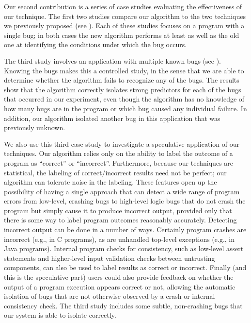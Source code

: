 \documentclass[draft]{sig-alternate}
\begin{document}
Our second contribution is a series of case studies evaluating the effectiveness of
our technique.  The first two studies compare our algorithm to the two techniques
we previously proposed (see ).  Each of these studies focuses on a
program with a single bug; in both cases the new algorithm
performs at least as well as the old one at identifying the conditions under which the bug occurs.  

The third study involves an application with multiple known bugs (see
).  Knowing the bugs makes this a controlled study, 
in the sense that we are able to determine whether the algorithm fails to recognize any of the
bugs.  The results show that the algorithm correctly
isolates strong predictors for each of the bugs that occurred in our
experiment, even though the algorithm has no knowledge of how many
bugs are in the program or which bug caused any individual failure.
In addition, our algorithm isolated another bug in this application that was previously unknown.

We also use this third case study to investigate a speculative
application of our techniques.  Our algorithm relies only on the
ability to label the outcome of a program as ``correct'' or
``incorrect''.  Furthermore, because our techniques are statistical,
the labeling of correct/incorrect results need not be perfect; our
algorithm can tolerate noise in the labeling.  These features open up
the possibility of having a single approach that can detect a wide
range of program errors from low-level, crashing bugs to high-level
logic bugs that do not crash the program but simply cause it to
produce incorrect output, provided only that there is some way to
label program outcomes reasonably accurately.  Detecting incorrect
output can be done in a number of ways.  Certainly program crashes are
incorrect (e.g., in C programs), as are unhandled top-level exceptions
(e.g., in Java programs).  Internal program checks for consistency,
such as low-level assert statements and higher-level input validation
checks between untrusting components, can also be used to label
results as correct or incorrect.  Finally (and this is the speculative
part) users could also provide feedback on whether the output of a
program execution appears correct or not, allowing the automatic
isolation of bugs that are not otherwise observed by a crash or
internal consistency check.  The third study includes some subtle,
non-crashing bugs that our system is able to isolate correctly.
\end{document}
